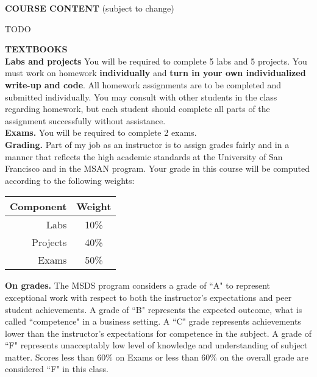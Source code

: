 \documentclass[11pt]{article}
\newenvironment{itemize*}%
  {\begin{itemize}%
    \setlength{\itemsep}{0pt}%
    \setlength{\parskip}{0pt}}%
  {\end{itemize}}
\begin{document}
\vspace{0.5in}

\noindent \textbf{COURSE CONTENT} (subject to change)

\vspace{-0.05in}

\begin{itemize*}
\item	 TODO
\end{itemize*}
\vspace{0.1in}

\noindent \noindent \textbf{TEXTBOOKS} \\



\noindent \textbf{Labs and projects} You will be required to complete 5  labs  and 5 projects. You must work on homework \textbf{individually} and \textbf{turn in your own individualized write-up and code}. All homework assignments are to be completed and submitted individually. You may consult with other students in the class regarding homework, but each student should complete all parts of the assignment successfully without assistance.\\

\noindent \textbf{Exams.} You will be required to complete 2 exams.  \\

\noindent \textbf{Grading.} Part of my job as an instructor is to assign grades fairly and in a manner that reflects the high academic standards at the University of San Francisco and in the MSAN program. Your grade in this course will be computed according to the following weights:\\

\vspace{-0.15in}

\begin{center}
\begin{tabular}{|r|c|}
  \hline
  \textbf{Component} & \textbf{Weight} \\
  \hline
  Labs & 10\% \\
  Projects & 40\% \\
  Exams & 50\%  \\
  \hline
\end{tabular}
\end{center}

\noindent \textbf{On grades.} The MSDS program considers a grade of ``A" to represent exceptional work with respect to both the instructor's expectations and peer student achievements. A grade of ``B" represents the expected outcome, what is called ``competence" in a business setting. A ``C" grade represents achievements lower than the instructor's expectations for competence in the subject. A grade of ``F" represents unacceptably low level of knowledge and understanding of subject matter.  Scores less than 60\% on Exams or less than 60\% on the overall grade are considered ``F" in this class. \\
\end{document}
